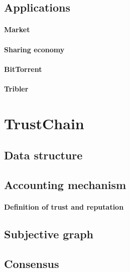 \subsection{Applications}

\paragraph{Market}
\paragraph{Sharing economy}
\paragraph{BitTorrent}
\paragraph{Tribler}

\section{TrustChain}

\subsection{Data structure}
\subsection{Accounting mechanism}
\paragraph{Definition of trust and reputation}
\subsection{Subjective graph}
\subsection{Consensus}

